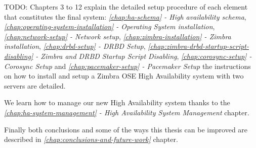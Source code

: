 TODO: Chapters 3 to 12 explain the detailed setup procedure of each element that constitutes the final system: \textit{\ref{chap:ha-schema} - High availability schema},
\textit{\ref{chap:operating-system-installation} - Operating System installation},
\textit{\ref{chap:network-setup} - Network setup},
\textit{\ref{chap:zimbra-installation} - Zimbra installation},
\textit{\ref{chap:drbd-setup} - DRBD Setup},
\textit{\ref{chap:zimbra-drbd-startup-script-disabling} - Zimbra and DRBD Startup Script Disabling},
\textit{\ref{chap:corosync-setup} - Corosync Setup} and
\textit{\ref{chap:pacemaker-setup} - Pacemaker Setup}
the instructions on how to install and setup a Zimbra OSE High Availability system  with two servers are detailed.

We learn how to manage our new High Availability system thanks to the \textit{\ref{chap:ha-system-management} - High Availability System Management} chapter.

Finally both conclusions and some of the ways this thesis can be improved are described in \textit{\ref{chap:conclusions-and-future-work}} chapter.


